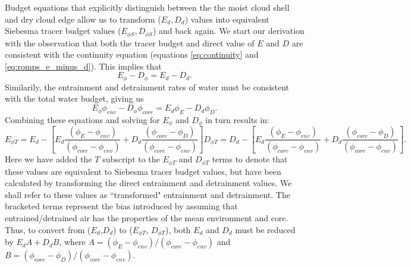 \documentclass[12pt]{article}
\begin{document}
Budget equations that explicitly distinguish between the the moist
cloud shell and dry cloud edge allow us to transform ($E_d, D_d$)
values into equivalent Siebesma tracer budget values ($E_{\phi S},
D_{\phi S}$) and back again.  We start our derivation with the observation 
that both the tracer budget and direct value of $E$ and $D$ are consistent 
with the continuity equation (equations \ref{eq:continuity} and 
\ref{eq:romps_e_minus_d}).  This implies that 
\begin{equation}
  E_{\phi} - D_{\phi} = E_d - D_d.
\end{equation}
Similarily, the entrainment and detrainment rates of water must be consistent 
with the total water budget, giving us
\begin{equation}
  E_{\phi} \phi_{env} - D_{\phi} \phi_{core} = E_d \phi_E - D_d \phi_D.
\end{equation}
Combining these equations and solving for $E_{\phi}$ and $D_{\phi}$ in turn 
results in:
\begin{subequations}
  \label{eq:correctedED}
\begin{equation}
  \label{eq:corrected_entrainment}
    E_{\phi T} = E_d 
             - \left[E_d\frac{(\phi_E - \phi_{env})}
                             {(\phi_{core} - \phi_{env})}
                   + D_d\frac{(\phi_{core} - \phi_D)}
                             {(\phi_{core} - \phi_{env})}\right]
\end{equation}
\begin{equation}
  \label{eq:corrected_detrainment}
    D_{\phi T} = D_d
             - \left[E_d\frac{(\phi_E - \phi_{env})}
                             {(\phi_{core} - \phi_{env})}
                   + D_d\frac{(\phi_{core} - \phi_D)}
                             {(\phi_{core} - \phi_{env})}\right].
\end{equation}
\end{subequations}
Here we have added the $T$ subscript to the $E_{\phi T}$ and $D_{\phi T}$ terms 
to denote that these values are equivalent to Siebesma tracer budget values,
but have been calculated by transforming the direct entrainment and detrainment 
values.  We shall refer to these values as ``transformed" entrainment and 
detrainment.  The bracketed terms represent the bias introduced by assuming 
that entrained/detrained air has the properties of the mean environment and
core.  Thus, to convert from ($E_d$,$D_d$) to ($E_{\phi T}$, $D_{\phi  T}$), 
both $E_d$ and $D_d$ must be reduced by $E_d A + D_d B$, where
$A = (\phi_E - \phi_{env})/(\phi_{core} - \phi_{env})$ and 
$B = (\phi_{core} - \phi_D)/(\phi_{core} - \phi_{env})$.  
\end{document}
